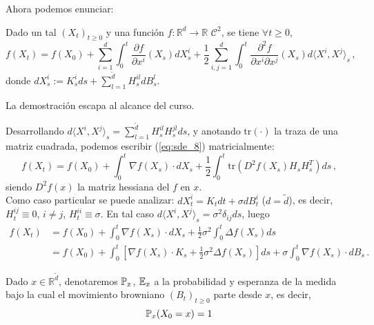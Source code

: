 \newp Ahora podemos enunciar: 
\begin{theorem}
Dado un tal $(X_t)_{t \ge 0}$  y una función $f: \mathbb{R}^d \to \mathbb{R}$ $\mathcal{C}^2$, se tiene $\forall t \ge 0$, 
\begin{equation*}
    \label{eq:sde_8}
    \tag{$\star$}
    f(X_t) = f(X_0) + \sum_{i=1}^{d} \int_{0}^{t} \frac{\partial f}{\partial x^i} (X_s) dX_s^i + \frac{1}{2} \sum_{i,j = 1}^{d} \int_{0}^{t} \frac{\partial^2 f}{\partial x^i \partial x^j}(X_s) d \langle X^i, X^j \rangle _s \,,
\end{equation*}
donde $dX_s^i := K_s^i ds + \sum_{l=1}^{\tilde{d}} H_{s}^{il} dB_s^l$.
\end{theorem}

La demostración escapa al alcance del curso. 

\newp Desarrollando $d \langle X^i, X^j \rangle _s = \sum_{l=1}^{\tilde{d}} H_{s}^{il} H_{s}^{jl} ds$, y anotando $\text{tr}(\cdot)$ la traza de una matriz cuadrada, podemos escribir (\ref{eq:sde_8}) matricialmente: 
\begin{equation*}
    f(X_t) = f(X_0) + \int_{0}^{t} \nabla f(X_s) \cdot dX_s + \frac{1}{2} \int_{0}^{t} \text{tr} \left( D^2 f(X_s) H_s H_s^{T} \right) ds \,,
\end{equation*}
siendo $D^2 f(x)$ la matriz hessiana del $f$ en $x$. 
\\ Como caso particular se puede analizar: $dX_t^i = K_t dt + \sigma dB_t^i$ ($d = \tilde{d}$), es decir, $H_t^{ij} \equiv 0$, $i \neq j$, 
$H_t^{ii} \equiv \sigma$. En tal caso $d \langle X^i, X^j \rangle _s = \sigma^2 \delta_{ij} ds$, luego 
\begin{align*}
    f(X_t) & = f(X_0) + \int_{0}^{t} \nabla f(X_s) \cdot d X_s + \frac{1}{2} \sigma^2 \int_0^{t} \Delta f(X_s) ds \\ 
    & = f(X_0) + \int_{0}^{t} \left[ \nabla f(X_s) \cdot K_s + \frac{1}{2} \sigma^2 \Delta f(X_s) \right] ds + \sigma \int_{0}^{t} \nabla f(X_s) \cdot dB_s \,.
\end{align*}

\begin{definition}
Dado $x \in \mathbb{R}^{\tilde{d}}$, denotaremos $\P_x$, $\E_x$ a la probabilidad y esperanza de la medida bajo la cual el movimiento browniano $(B_t)_{t \ge 0}$ parte desde $x$, es decir, 
\begin{equation*}
    \P_x (X_0 = x) = 1
\end{equation*}
\end{definition}

